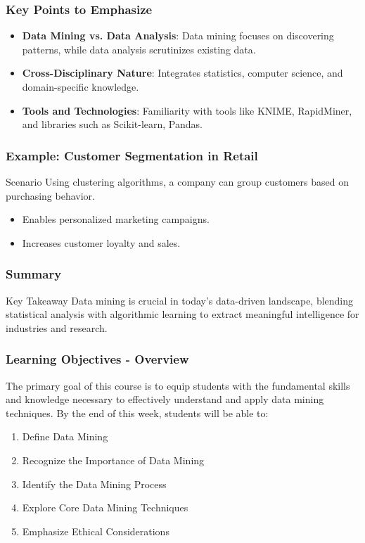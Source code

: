 \documentclass{beamer}
\begin{document}
\begin{frame}[fragile]
    \frametitle{Key Points to Emphasize}
    \begin{itemize}
        \item \textbf{Data Mining vs. Data Analysis}: Data mining focuses on discovering patterns, while data analysis scrutinizes existing data.
        \item \textbf{Cross-Disciplinary Nature}: Integrates statistics, computer science, and domain-specific knowledge.
        \item \textbf{Tools and Technologies}: Familiarity with tools like KNIME, RapidMiner, and libraries such as Scikit-learn, Pandas.
    \end{itemize}
\end{frame}

\begin{frame}[fragile]
    \frametitle{Example: Customer Segmentation in Retail}
    \begin{block}{Scenario}
        Using clustering algorithms, a company can group customers based on purchasing behavior.
    \end{block}
    \begin{itemize}
        \item Enables personalized marketing campaigns.
        \item Increases customer loyalty and sales.
    \end{itemize}
\end{frame}

\begin{frame}[fragile]
    \frametitle{Summary}
    \begin{block}{Key Takeaway}
        Data mining is crucial in today's data-driven landscape, blending statistical analysis with algorithmic learning to extract meaningful intelligence for industries and research.
    \end{block}
\end{frame}

\begin{frame}[fragile]
    \frametitle{Learning Objectives - Overview}
    The primary goal of this course is to equip students with the fundamental skills and knowledge necessary to effectively understand and apply data mining techniques. By the end of this week, students will be able to:
    
    \begin{enumerate}
        \item Define Data Mining
        \item Recognize the Importance of Data Mining
        \item Identify the Data Mining Process
        \item Explore Core Data Mining Techniques
        \item Emphasize Ethical Considerations
    \end{enumerate}
\end{frame}
\end{document}
